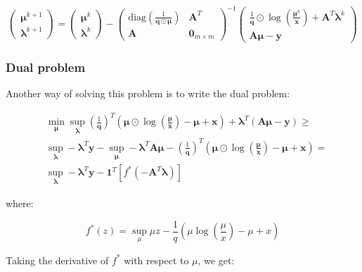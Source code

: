 \documentclass{tex/note}
\begin{document}
\begin{equation*}
\begin{pmatrix} \bm{\mu}^{k + 1} \\ \bm{\lambda}^{k + 1} \end{pmatrix} = \begin{pmatrix} \bm{\mu}^k \\ \bm{\lambda}^k \end{pmatrix} - \begin{pmatrix} \text{diag} \left( \frac{1}{\bm{q} \odot \bm{\mu}} \right)  & \bm{A}^T \\ \bm{A} & \bm{0}_{m \times m} \end{pmatrix} ^{-1} \begin{pmatrix} \frac{1}{\bm{q}} \odot \log \left( \frac{\bm{\mu}^k}{\bm{x}} \right) + \bm{A}^T \bm{\lambda}^k \\ \bm{A} \bm{\mu} - \bm{y} \end{pmatrix}
\end{equation*}

\subsubsection{Dual problem}

Another way of solving this problem is to write the dual problem:

\begin{align*}
& \min_{\bm{\mu}} \sup_{\bm{\lambda}} \left( \frac{1}{\bm{q}} \right)^T \left( \bm{\mu} \odot \log \left( \frac{\bm{\mu}}{\bm{x}} \right) - \bm{\mu} + \bm{x} \right) + \bm{\lambda}^T \left( \bm{A} \bm{\mu} - \bm{y} \right) \geq \\
& \sup_{\bm{\lambda}} - \bm{\lambda}^T \bm{y} - \sup_{\bm{\mu}} - \bm{\lambda}^T \bm{A} \bm{\mu} - \left( \frac{1}{\bm{q}} \right)^T \left( \bm{\mu} \odot \log \left( \frac{\bm{\mu}}{\bm{x}} \right) - \bm{\mu} + \bm{x} \right) = \\
& \sup_{\bm{\lambda}} - \bm{\lambda}^T \bm{y} -  \bm{1}^T \left[ f^* \left( - \bm{A}^T \bm{\lambda} \right) \right]
\end{align*}

where:

\begin{equation*}
f^* \left( z \right) = \sup_{\mu} \mu z - \frac{1}{q} \left( \mu \log \left( \frac{\mu}{x} \right) - \mu + x \right)
\end{equation*}

Taking the derivative of $f^*$ with respect to $\mu$, we get:
\end{document}
